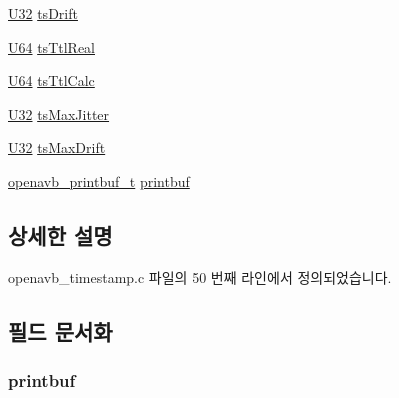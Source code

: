 \begin{DoxyCompactItemize}
\item 
\hyperlink{openavb__types__base__pub_8h_a696390429f2f3b644bde8d0322a24124}{U32} \hyperlink{structopenavb__timestamp__eval_aa8195bd83398843308cd431a7939d6a1}{ts\+Drift}
\item 
\hyperlink{openavb__types__base__pub_8h_a25809e0734a149248fcf5831efa4e33d}{U64} \hyperlink{structopenavb__timestamp__eval_a5cb94701ae677c7fb2f21313976a1c67}{ts\+Ttl\+Real}
\item 
\hyperlink{openavb__types__base__pub_8h_a25809e0734a149248fcf5831efa4e33d}{U64} \hyperlink{structopenavb__timestamp__eval_a6f760ec3192bb0002bd92a5bff3e9367}{ts\+Ttl\+Calc}
\item 
\hyperlink{openavb__types__base__pub_8h_a696390429f2f3b644bde8d0322a24124}{U32} \hyperlink{structopenavb__timestamp__eval_a1cdfd1424f1cf707d0ccfe076858f0a9}{ts\+Max\+Jitter}
\item 
\hyperlink{openavb__types__base__pub_8h_a696390429f2f3b644bde8d0322a24124}{U32} \hyperlink{structopenavb__timestamp__eval_a3bd5d77cfe79675562f49f399572d4d6}{ts\+Max\+Drift}
\item 
\hyperlink{openavb__printbuf_8h_a97340881222c473cde4e8f53edfb66f4}{openavb\+\_\+printbuf\+\_\+t} \hyperlink{structopenavb__timestamp__eval_aa8cf99a5ee25c2e2350b10c34634f01f}{printbuf}
\end{DoxyCompactItemize}


\subsection{상세한 설명}


openavb\+\_\+timestamp.\+c 파일의 50 번째 라인에서 정의되었습니다.



\subsection{필드 문서화}
\subsubsection[{\texorpdfstring{printbuf}{printbuf}}]{ printbuf}\hypertarget{structopenavb__timestamp__eval_aa8cf99a5ee25c2e2350b10c34634f01f}{}\label{structopenavb__timestamp__eval_aa8cf99a5ee25c2e2350b10c34634f01f}


